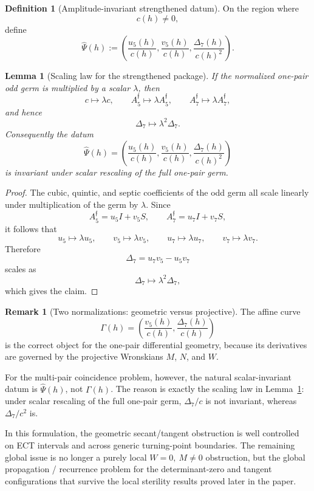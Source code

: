 \documentclass[11pt,a4paper]{amsart}
\theoremstyle{plain}
\newtheorem{lemma}[theorem]{Lemma}
\theoremstyle{definition}
\newtheorem{definition}[theorem]{Definition}
\newtheorem{remark}[theorem]{Remark}
\begin{document}
\begin{definition}[Amplitude-invariant strengthened datum]
\label{def:amplitude-invariant-strengthened-datum}
On the region where
\[
c(h)\neq 0,
\]
define
\[
\widehat\Psi(h):=
\left(
\frac{u_5(h)}{c(h)},
\frac{v_5(h)}{c(h)},
\frac{\Delta_7(h)}{c(h)^2}
\right).
\]
\end{definition}

\begin{lemma}[Scaling law for the strengthened package]
\label{lem:scaling-law-strengthened-package}
If the normalized one-pair odd germ is multiplied by a scalar $\lambda$, then
\[
c\longmapsto \lambda c,
\qquad
A_5^{\mathfrak f}\longmapsto \lambda A_5^{\mathfrak f},
\qquad
A_7^{\mathfrak f}\longmapsto \lambda A_7^{\mathfrak f},
\]
and hence
\[
\Delta_7\longmapsto \lambda^2 \Delta_7.
\]
Consequently the datum
\[
\widehat\Psi(h)=
\left(
\frac{u_5(h)}{c(h)},
\frac{v_5(h)}{c(h)},
\frac{\Delta_7(h)}{c(h)^2}
\right)
\]
is invariant under scalar rescaling of the full one-pair germ.
\end{lemma}

\begin{proof}
The cubic, quintic, and septic coefficients of the odd germ all scale linearly
under multiplication of the germ by $\lambda$. Since
\[
A_5^{\mathfrak f}=u_5I+v_5S,
\qquad
A_7^{\mathfrak f}=u_7I+v_7S,
\]
it follows that
\[
u_5\mapsto \lambda u_5,\qquad v_5\mapsto \lambda v_5,
\qquad
u_7\mapsto \lambda u_7,\qquad v_7\mapsto \lambda v_7.
\]
Therefore
\[
\Delta_7=u_7v_5-u_5v_7
\]
scales as
\[
\Delta_7\mapsto \lambda^2\Delta_7,
\]
which gives the claim.
\end{proof}

\begin{remark}[Two normalizations: geometric versus projective]
\label{rem:two-normalizations-geometric-vs-projective}
The affine curve
\[
\Gamma(h)=\left(\frac{v_5(h)}{c(h)},\frac{\Delta_7(h)}{c(h)}\right)
\]
is the correct object for the one-pair differential geometry, because its
derivatives are governed by the projective Wronskians $M$, $N$, and $W$.

For the multi-pair coincidence problem, however, the natural scalar-invariant
datum is $\widehat\Psi(h)$, not $\Gamma(h)$. The reason is exactly the
scaling law in Lemma~\ref{lem:scaling-law-strengthened-package}: under scalar
rescaling of the full one-pair germ, $\Delta_7/c$ is not invariant, whereas
$\Delta_7/c^2$ is.
\end{remark}

In this formulation, the geometric secant/tangent obstruction is well controlled
on ECT intervals and across generic turning-point boundaries. The remaining
global issue is no longer a purely local $W=0,\ M\neq 0$ obstruction, but the
global propagation / recurrence problem for the determinant-zero and tangent
configurations that survive the local sterility results proved later in the
paper.
\end{document}
